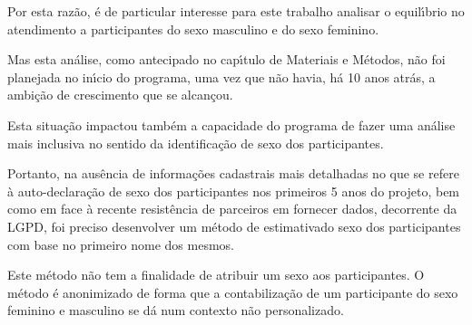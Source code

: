 \documentclass[
12pt,		%
openright,	%
twoside,  %
a4paper,			%
chapter=TITLE,		%
english,			%
french,				%
spanish,			%
brazil				%
]{USPSC-classe/USPSC}
\begin{document}
Por esta raz\~ao, \'e de particular interesse para este trabalho analisar o equil\'{\i}brio no atendimento a participantes do sexo masculino e do sexo feminino.

















Mas esta an\'alise, como antecipado no cap\'{\i}tulo de Materiais e M\'etodos, n\~ao foi planejada no in\'{\i}cio do programa, uma vez que n\~ao havia, h\'a 10 anos atr\'as, a ambi\c{c}\~ao de crescimento que se alcan\c{c}ou.

















Esta situa\c{c}\~ao impactou tamb\'em a capacidade do programa de fazer uma an\'alise mais inclusiva no sentido da identifica\c{c}\~ao de sexo dos participantes.

















Portanto, na aus\^encia de informa\c{c}\~oes cadastrais mais detalhadas no que se refere \`a auto-declara\c{c}\~ao de sexo dos participantes nos primeiros 5 anos do projeto, bem como em face \`a recente resist\^encia de parceiros em fornecer dados, decorrente da LGPD, foi preciso desenvolver um m\'etodo de \textquotedbl estimativa\textquotedbl  do sexo dos participantes com base no primeiro nome dos mesmos.

















Este m\'etodo n\~ao tem a finalidade de atribuir um sexo aos participantes. O m\'etodo \'e anonimizado de forma que a contabiliza\c{c}\~ao de um participante do sexo feminino e masculino se d\'a num contexto n\~ao personalizado.
\end{document}
